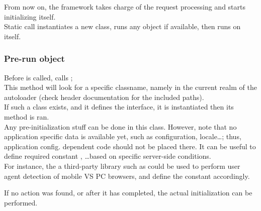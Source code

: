 \documentclass[pdftex,12pt,a4paper]{article}
\begin{document}
From now on, the framework takes charge of the request processing and starts initializing itself.\\
Static call  instantiates a new  class, runs any  object if available, then runs  on itself.

\subsubsection{Pre-run object} \label{sec:prerun-init}
Before  is called,  calls ; \\
This method will look for a specific classname, namely  in the current realm of the autoloader (check  header documentation for the included paths). \\
If such a class exists, and it defines the  interface, it is instantiated then its  method is ran. \\
Any pre-initialization stuff can be done in this class. However, note that no application specific data is available yet, such as configuration, locale\ldots; thus, application config. dependent code should not be placed there. It can be useful to define required constant , \ldots based on specific server-side conditions. \\
For instance, the a third-party library such as  could be used to perform user agent detection of mobile VS PC browsers, and define the  constant accordingly.

If no  action was found, or after it has completed, the actual initialization can be performed.
\end{document}
